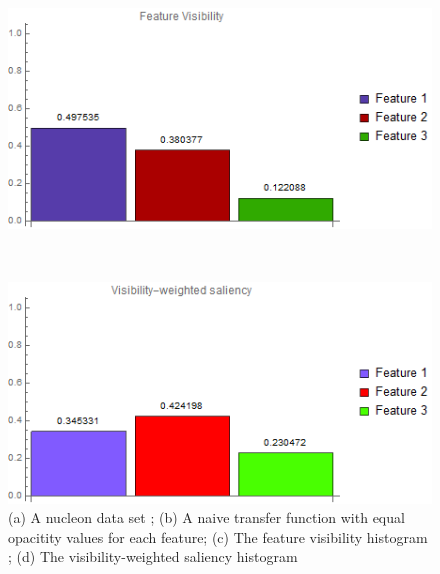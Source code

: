 \begin{figure}
\begin{minipage}{.15\textwidth}
	\subcaption{}
\end{minipage}~
\begin{minipage}{.25\textwidth}
	\includegraphics[width=1\linewidth]{images/nucleon_naive_visibility_chart}
	\subcaption{}
\end{minipage}~
\begin{minipage}{.25\textwidth}
	\includegraphics[width=1\linewidth]{images/nucleon_naive_visibility_saliency_weighted_chart}
	\subcaption{}
\end{minipage}
\caption[A nucleon data set with a naive transfer function]{(a) A nucleon data set \cite{website:Voreen_datasets_2013}; (b) A naive transfer function with equal opacitity values for each feature; (c) The feature visibility histogram \cite{wang_efficient_2011}; (d) The visibility-weighted saliency histogram}
\label{fig:nucleon_naive}
\end{figure}

